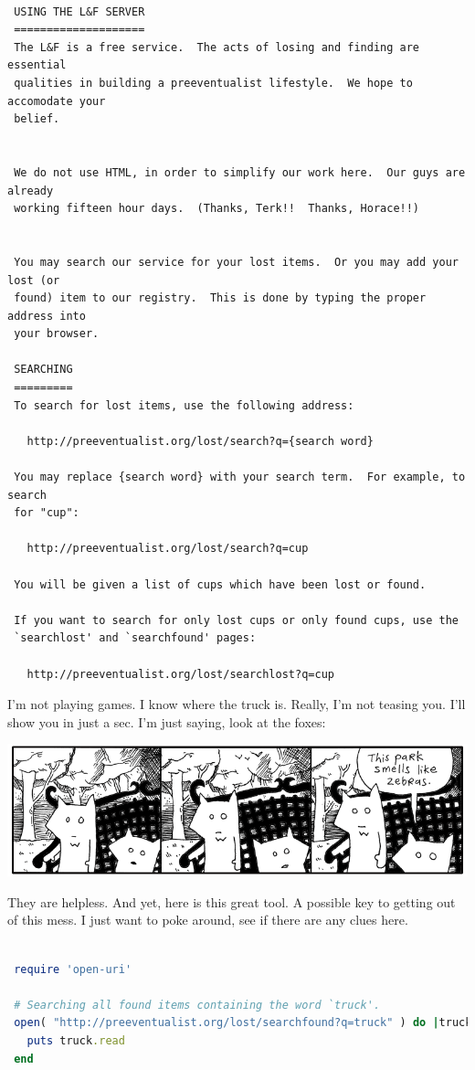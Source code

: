 \documentclass[10pt,twoside]{report}
\begin{document}
\begin{lstlisting}

 USING THE L&F SERVER
 ====================
 The L&F is a free service.  The acts of losing and finding are essential
 qualities in building a preeventualist lifestyle.  We hope to accomodate your
 belief.


 We do not use HTML, in order to simplify our work here.  Our guys are already
 working fifteen hour days.  (Thanks, Terk!!  Thanks, Horace!!)


 You may search our service for your lost items.  Or you may add your lost (or
 found) item to our registry.  This is done by typing the proper address into
 your browser.

 SEARCHING
 =========
 To search for lost items, use the following address:

   http://preeventualist.org/lost/search?q={search word}

 You may replace {search word} with your search term.  For example, to search
 for "cup":

   http://preeventualist.org/lost/search?q=cup

 You will be given a list of cups which have been lost or found.

 If you want to search for only lost cups or only found cups, use the
 `searchlost' and `searchfound' pages:

   http://preeventualist.org/lost/searchlost?q=cup

\end{lstlisting}


\newpage

I'm not playing games.  I know where the truck is.  Really, I'm not
teasing you.  I'll show you in just a sec.  I'm just saying, look at
the foxes:

	\includegraphics[width=1.0\textwidth]{cache/58.png}

They are helpless.  And yet, here is this great tool.  A possible key
to getting out of this mess. I just want to poke around, see if there
are any clues here.


\begin{lstlisting}[basicstyle=\ttfamily\color{basiccolor},
    commentstyle = \ttfamily\color{commentcolor},
    keywordstyle=\ttfamily\color{keywordscolor},
    stringstyle=\color{stringcolor},
    language=Ruby,
    basicstyle=\small\ttfamily,
    showstringspaces=false,
  ]

 require 'open-uri'

 # Searching all found items containing the word `truck'.
 open( "http://preeventualist.org/lost/searchfound?q=truck" ) do |truck|
   puts truck.read
 end

\end{lstlisting}
\end{document}
